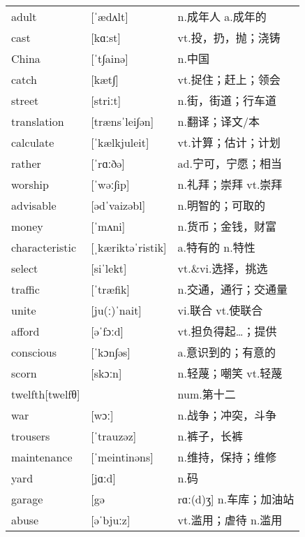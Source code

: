 \documentclass[a4paper]{article}
\begin{document}
\section{}
\begin{tabular}{l l l}

adult & [ˈædʌlt] & n.成年人 a.成年的 \\
cast & [kɑːst] & vt.投，扔，抛；浇铸 \\
China & [ˈt∫ainə] & n.中国 \\
catch & [kæt∫] & vt.捉住；赶上；领会 \\
street & [striːt] & n.街，街道；行车道 \\
translation & [trænsˈlei∫ən] & n.翻译；译文/本 \\
calculate & [ˈkælkjuleit] & vt.计算；估计；计划 \\
rather & [ˈrɑːðə] & ad.宁可，宁愿；相当 \\
worship & [ˈwəː∫ip] & n.礼拜；崇拜 vt.崇拜 \\
advisable & [ədˈvaizəbl] & n.明智的；可取的 \\
money & [ˈmʌni] & n.货币；金钱，财富 \\
characteristic & [ˌkæriktəˈristik] & a.特有的 n.特性 \\
select & [siˈlekt] & vt.\&vi.选择，挑选 \\
traffic & [ˈtræfik] & n.交通，通行；交通量 \\
unite & [ju(ː)ˈnait] & vi.联合 vt.使联合 \\
afford & [əˈfɔːd] & vt.担负得起…；提供 \\
conscious & [ˈkɔn∫əs] & a.意识到的；有意的 \\
scorn & [skɔːn] & n.轻蔑；嘲笑 vt.轻蔑 \\
twelfth[twelfθ] &  & num.第十二 \\
war & [wɔː] & n.战争；冲突，斗争 \\
trousers & [ˈtrauzəz] & n.裤子，长裤 \\
maintenance & [ˈmeintinəns] & n.维持，保持；维修 \\
yard & [jɑːd] & n.码 \\
garage & [gə & rɑː(d)ʒ] n.车库；加油站 \\
abuse & [əˈbjuːz] & vt.滥用；虐待 n.滥用 \\

\end{tabular}
\end{document}
